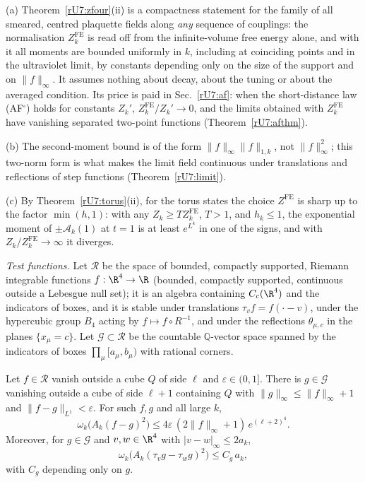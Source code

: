 \begin{remark}\label{rU7:zfourremark}
(a) Theorem~\ref{rU7:zfour}(ii) is a compactness statement for the family of
all smeared, centred plaquette fields along \emph{any} sequence of
couplings: the normalisation $Z_k^{\mathrm{FE}}$ is read off from the
infinite-volume free energy alone, and with it all moments are bounded
uniformly in $k$, including at coinciding points and in the ultraviolet
limit, by constants depending only on the size of the support and on
$\|f\|_\infty$. It assumes nothing about decay, about the tuning or about the
averaged condition. Its price is paid in Sec.~\ref{rU7:af}: when the
short-distance law (AF$^\square$) holds for constants $Z_k'$,
$Z_k^{\mathrm{FE}}/Z_k'\to0$, and the limits obtained with
$Z_k^{\mathrm{FE}}$ have vanishing separated two-point functions
(Theorem~\ref{rU7:afthm}).

(b) The second-moment bound is of the form $\|f\|_\infty\|f\|_{1,k}$, not
$\|f\|_\infty^2$; this two-norm form is what makes the limit field continuous
under translations and reflections of step functions
(Theorem~\ref{rU7:limit}).

(c) By Theorem~\ref{rU7:torus}(ii), for the torus states the choice
$Z^{\mathrm{FE}}$ is sharp up to the factor $\min(h,1)$: with any $Z_k\ge
TZ_k^{\mathrm{FE}}$, $T>1$, and $h_k\le1$, the exponential moment of
$\pm\mathcal A_k(1)$ at $t=1$ is at least $e^{L^4}$ in one of the signs, and
with $Z_k/Z_k^{\mathrm{FE}}\to\infty$ it diverges.
\end{remark}

\emph{Test functions.} Let $\mathcal R$ be the space of bounded, compactly
supported, Riemann integrable functions $f:\R^4\to\R$ (bounded, compactly
supported, continuous outside a Lebesgue null set); it is an algebra
containing $C_c(\R^4)$ and the indicators of boxes, and it is stable under
translations $\tau_vf=f(\cdot-v)$, under the hypercubic group $B_4$ acting by
$f\mapsto f\circ R^{-1}$, and under the reflections $\theta_{\mu,c}$ in the
planes $\{x_\mu=c\}$. Let $\mathcal G\subset\mathcal R$ be the countable
$\mathbb Q$-vector space spanned by the indicators of boxes $\prod_\mu[a_\mu,b_\mu)$
with rational corners.

\begin{lemma}[approximation]\label{rU7:approx}
Let $f\in\mathcal R$ vanish outside a cube $Q$ of side $\ell$ and $\varepsilon
\in(0,1]$. There is $g\in\mathcal G$ vanishing outside a cube of side $\ell+1$
containing $Q$ with $\|g\|_\infty\le\|f\|_\infty+1$ and $\|f-g\|_{L^1}<
\varepsilon$. For such $f,g$ and all large $k$,
\[
\omega_k\bigl(A_k(f-g)^2\bigr)\le4\varepsilon\,(2\|f\|_\infty+1)\,
e^{(\ell+2)^4}.
\]
Moreover, for $g\in\mathcal G$ and $v,w\in\R^4$ with $|v-w|_\infty\le2a_k$,
\[
\omega_k\bigl(A_k(\tau_vg-\tau_wg)^2\bigr)\le C_g\,a_k ,
\]
with $C_g$ depending only on $g$.
\end{lemma}

